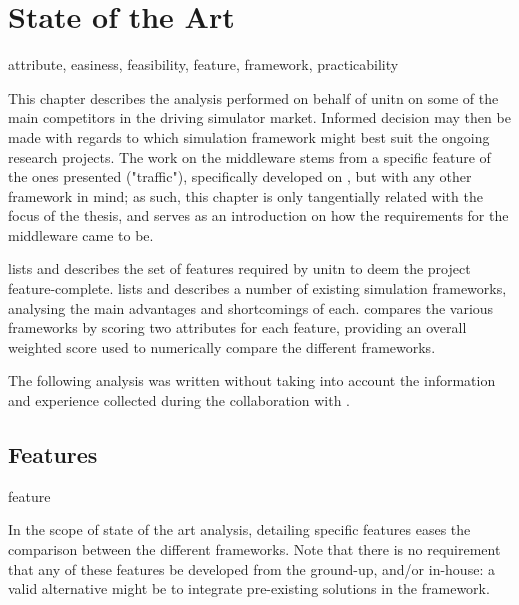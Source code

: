 \chapter{State of the Art}\label{ch:stateoftheart} %

\begin{keywords}
	attribute, easiness, feasibility, feature, framework, practicability
\end{keywords}

This chapter describes the analysis performed on behalf of \gls{unitn} on some of the main competitors in the driving simulator market. Informed decision may then be made with regards to which simulation \gls{framework} might best suit the ongoing research projects. The work on the \gls{middleware} stems from a specific feature of the ones presented ("traffic"), specifically developed on , but with any other \gls{framework} in mind; as such, this chapter is only tangentially related with the focus of the thesis, and serves as an introduction on how the requirements for the \gls{middleware} came to be.

 lists and describes the set of \glspl{feature} required by \gls{unitn} to deem the project feature-complete.  lists and describes a number of existing simulation \glspl{framework}, analysing the main advantages and shortcomings of each.  compares the various \glspl{framework} by scoring two \glspl{attribute} for each \gls{feature}, providing an overall weighted score used to numerically compare the different \glspl{framework}.

The following analysis was written without taking into account the information and experience collected during the collaboration with .

\section{Features}\label{sc:stateoftheart:features}

\begin{definition}{feature}
\end{definition}

In the scope of state of the art analysis, detailing specific \glspl{feature} eases the comparison between the different \glspl{framework}. Note that there is no requirement that any of these \glspl{feature} be developed from the ground-up, and/or in-house: a valid alternative might be to integrate pre-existing solutions in the \gls{framework}.


